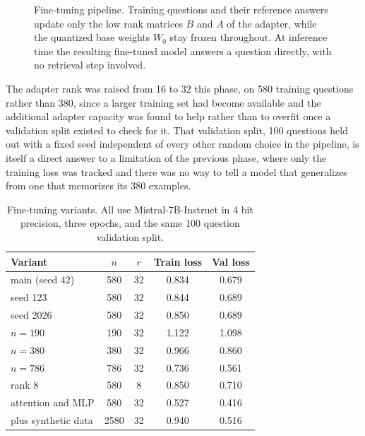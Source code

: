 \documentclass[11pt, a4paper]{article}
\begin{document}
\begin{figure}[t]
\centering
{}
\caption{Fine-tuning pipeline. Training questions and their reference answers update only the low rank matrices $B$ and $A$ of the adapter, while the quantized base weights $W_0$ stay frozen throughout. At inference time the resulting fine-tuned model answers a question directly, with no retrieval step involved.}
\label{fig:ftdiagram}
\end{figure}

The adapter rank was raised from 16 to 32 this phase, on 580 training questions rather than 380, since a larger training set had become available and the additional adapter capacity was found to help rather than to overfit once a validation split existed to check for it. That validation split, 100 questions held out with a fixed seed independent of every other random choice in the pipeline, is itself a direct answer to a limitation of the previous phase, where only the training loss was tracked and there was no way to tell a model that generalizes from one that memorizes its 380 examples.

\begin{table}[H]
\centering
\small
\begin{tabular}{lcccc}
\toprule
\textbf{Variant} & \textbf{$n$} & \textbf{$r$} & \textbf{Train loss} & \textbf{Val loss} \\
\midrule
main (seed 42) & 580 & 32 & 0.834 & 0.679 \\
seed 123 & 580 & 32 & 0.844 & 0.689 \\
seed 2026 & 580 & 32 & 0.850 & 0.689 \\
$n=190$ & 190 & 32 & 1.122 & 1.098 \\
$n=380$ & 380 & 32 & 0.966 & 0.860 \\
$n=786$ & 786 & 32 & 0.736 & 0.561 \\
rank 8 & 580 & 8 & 0.850 & 0.710 \\
attention and MLP & 580 & 32 & 0.527 & 0.416 \\
plus synthetic data & 2580 & 32 & 0.940 & 0.516 \\
\bottomrule
\end{tabular}
\caption{Fine-tuning variants. All use Mistral-7B-Instruct in 4 bit precision, three epochs, and the same 100 question validation split.}
\label{tab:finetune}
\end{table}
\end{document}
